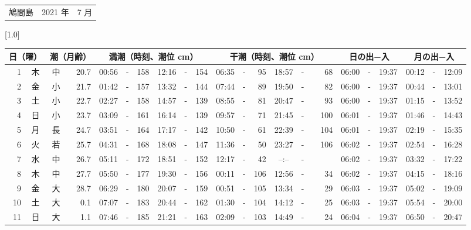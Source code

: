 \documentclass[12pt,a4j]{jsarticle}
\begin{document}
 \begin{table}[htbp]
 \begin{center}
 \begin{tabular}{lcc}
 \LARGE{鳩間島}  & \large{2021 年} & \large{ 7 月} \\
 \end{tabular}
 \end{center}
 \begin{center}
    \scalebox{0.7}[1.0]{
    \begin{tabular}{|rc|cr|ccrccr|ccrccr|ccc|ccc|}
    \hline
    \multicolumn{2}{|c|}{日（曜）} & \multicolumn{2}{c|}{潮（月齢）} & \multicolumn{6}{c|}{満潮（時刻、潮位 cm）} & \multicolumn{6}{c|}{干潮（時刻、潮位 cm）} & \multicolumn{3}{c|}{日の出−入} &  \multicolumn{3}{c|}{月の出−入}\\
 \hline
 1 & 木 & 中 & 20.7 &  00:56 &-& 158 &  12:16 &-& 154 &  06:35 &-&  95 &  18:57 &-&  68 & 06:00 & -& 19:37 & 00:12 & -& 12:09 \\
 2 & 金 & 小 & 21.7 &  01:42 &-& 157 &  13:32 &-& 144 &  07:44 &-&  89 &  19:50 &-&  82 & 06:00 & -& 19:37 & 00:44 & -& 13:01 \\
 3 & 土 & 小 & 22.7 &  02:27 &-& 158 &  14:57 &-& 139 &  08:55 &-&  81 &  20:47 &-&  93 & 06:00 & -& 19:37 & 01:15 & -& 13:52 \\
 4 & 日 & 小 & 23.7 &  03:09 &-& 161 &  16:14 &-& 139 &  09:57 &-&  71 &  21:45 &-& 100 & 06:01 & -& 19:37 & 01:46 & -& 14:43 \\
 5 & 月 & 長 & 24.7 &  03:51 &-& 164 &  17:17 &-& 142 &  10:50 &-&  61 &  22:39 &-& 104 & 06:01 & -& 19:37 & 02:19 & -& 15:35 \\
 6 & 火 & 若 & 25.7 &  04:31 &-& 168 &  18:08 &-& 147 &  11:36 &-&  50 &  23:27 &-& 106 & 06:02 & -& 19:37 & 02:54 & -& 16:28 \\
 7 & 水 & 中 & 26.7 &  05:11 &-& 172 &  18:51 &-& 152 &  12:17 &-&  42 &  --:-- &-&~~~~~ & 06:02 & -& 19:37 & 03:32 & -& 17:22 \\
 8 & 木 & 中 & 27.7 &  05:50 &-& 177 &  19:30 &-& 156 &  00:11 &-& 106 &  12:56 &-&  34 & 06:02 & -& 19:37 & 04:15 & -& 18:16 \\
 9 & 金 & 大 & 28.7 &  06:29 &-& 180 &  20:07 &-& 159 &  00:51 &-& 105 &  13:34 &-&  29 & 06:03 & -& 19:37 & 05:02 & -& 19:09 \\
10 & 土 & 大 &  0.1 &  07:07 &-& 183 &  20:44 &-& 162 &  01:30 &-& 104 &  14:12 &-&  25 & 06:03 & -& 19:37 & 05:54 & -& 20:00 \\
11 & 日 & 大 &  1.1 &  07:46 &-& 185 &  21:21 &-& 163 &  02:09 &-& 103 &  14:49 &-&  24 & 06:04 & -& 19:37 & 06:50 & -& 20:47 \\

\end{tabular}}
\end{center}
\end{table}
\end{document}
